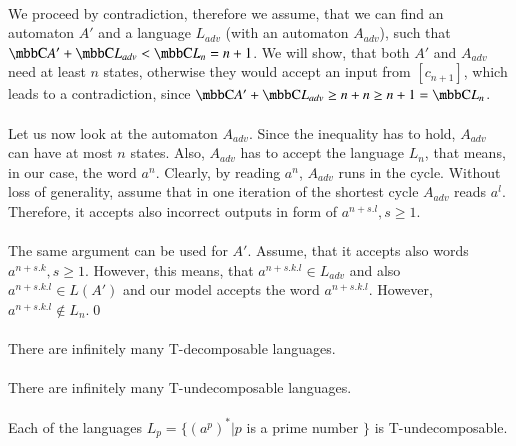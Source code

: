 \paragraph{}
We proceed by contradiction, therefore we assume, that we can find an automaton $A'$ and a language $L_{adv}$ (with an automaton $A_{adv}$), such that $\C{A'} + \C{L_{adv}} < \C{L_n} = n+1$. We will show, that both $A'$ and $A_{adv}$ need at least $n$ states, otherwise they would accept an input from $[c_{n+1}]$, which leads to a contradiction, since $\C{A'} + \C{L_{adv}} \geq n+n \geq n+1 = \C{L_n}$.

\paragraph{}
Let us now look at the automaton $A_{adv}$. Since the inequality has to hold, $A_{adv}$ can have at most $n$ states. Also, $A_{adv}$ has to accept the language $L_n$, that means, in our case, the word $a^n$. Clearly, by reading $a^n$, $A_{adv}$ runs in the cycle. Without loss of generality, assume that in one iteration of the shortest cycle $A_{adv}$ reads $a^l$. Therefore, it accepts also incorrect outputs in form of $a^{n + s.l}, s \geq 1$.

\paragraph{}
The same argument can be used for $A'$. Assume, that it accepts also words $a^{n + s.k}, s \geq 1$. However, this means, that $a^{n+s.k.l} \in L_{adv}$ and also $a^{n+s.k.l} \in L(A')$ and our model accepts the word $a^{n + s.k.l}$. However, $a^{n + s.k.l} \notin L_n$.\qed

\paragraph{}
\cdosledok There are infinitely many T-decomposable languages.

\paragraph{}
\cveta There are infinitely many T-undecomposable languages.

\paragraph{}
\dokaz Each of the languages $L_{p} = \{ (a^p)^* | p$ is a prime number $\}$ is T-undecomposable.


